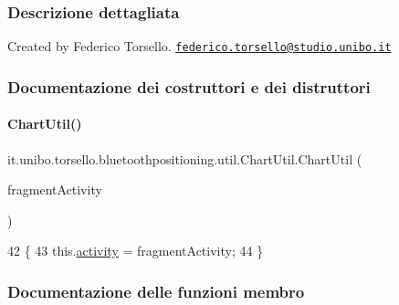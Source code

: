\subsubsection{Descrizione dettagliata}
Created by Federico Torsello. \href{mailto:federico.torsello@studio.unibo.it}{\tt federico.\+torsello@studio.\+unibo.\+it} 

\subsubsection{Documentazione dei costruttori e dei distruttori}
\hypertarget{classit_1_1unibo_1_1torsello_1_1bluetoothpositioning_1_1util_1_1ChartUtil_a255b439c7574dc7858355e3fc71ca6f7_a255b439c7574dc7858355e3fc71ca6f7}{}\label{classit_1_1unibo_1_1torsello_1_1bluetoothpositioning_1_1util_1_1ChartUtil_a255b439c7574dc7858355e3fc71ca6f7_a255b439c7574dc7858355e3fc71ca6f7} 
\paragraph{\texorpdfstring{Chart\+Util()}{ChartUtil()}}
{\footnotesize\ttfamily it.\+unibo.\+torsello.\+bluetoothpositioning.\+util.\+Chart\+Util.\+Chart\+Util (\begin{DoxyParamCaption}\item[{Fragment\+Activity}]{fragment\+Activity }\end{DoxyParamCaption})}


\begin{DoxyCode}
42                                                         \{
43         this.\hyperlink{classit_1_1unibo_1_1torsello_1_1bluetoothpositioning_1_1util_1_1ChartUtil_acf9c1988f7aaacc3f3354ac7e9eeef6a_acf9c1988f7aaacc3f3354ac7e9eeef6a}{activity} = fragmentActivity;
44     \}
\end{DoxyCode}


\subsubsection{Documentazione delle funzioni membro}
\hypertarget{classit_1_1unibo_1_1torsello_1_1bluetoothpositioning_1_1util_1_1ChartUtil_a7460cb57f8ad402dc522b592bc40f7b2_a7460cb57f8ad402dc522b592bc40f7b2}{}\label{classit_1_1unibo_1_1torsello_1_1bluetoothpositioning_1_1util_1_1ChartUtil_a7460cb57f8ad402dc522b592bc40f7b2_a7460cb57f8ad402dc522b592bc40f7b2} 
